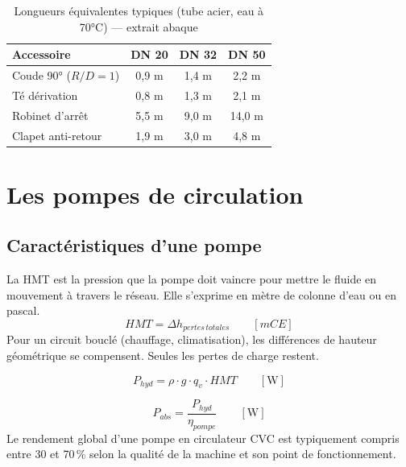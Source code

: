 \begin{table}[H]
  \centering
  \caption{Longueurs équivalentes typiques (tube acier, eau à 70°C) — extrait abaque}
  \begin{tabular}{lccc}
    \toprule
    Accessoire & DN 20 & DN 32 & DN 50 \\
    \midrule
    Coude 90° ($R/D=1$) & 0,9 m & 1,4 m & 2,2 m \\
    Té dérivation & 0,8 m & 1,3 m & 2,1 m \\
    Robinet d'arrêt & 5,5 m & 9,0 m & 14,0 m \\
    Clapet anti-retour & 1,9 m & 3,0 m & 4,8 m \\
    \bottomrule
  \end{tabular}
\end{table}

\section{Les pompes de circulation}

\subsection{Caractéristiques d'une pompe}

\begin{definition}[title=Hauteur manométrique totale (HMT)]
La HMT est la pression que la pompe doit vaincre pour mettre le fluide en mouvement à travers le réseau. Elle s'exprime en mètre de colonne d'eau ou en pascal.
\begin{equation}
  HMT = \Delta h_{pertes\,totales} \qquad \left[\si{mCE}\right]
\end{equation}
Pour un circuit bouclé (chauffage, climatisation), les différences de hauteur géométrique se compensent. Seules les pertes de charge restent.
\end{definition}

\begin{definition}[title=Puissance hydraulique]
\begin{equation}
  P_{hyd} = \rho \cdot g \cdot q_v \cdot HMT \qquad \left[\si{\watt}\right]
\end{equation}
\end{definition}

\begin{definition}[title=Puissance absorbée et rendement]
\begin{equation}
  P_{abs} = \frac{P_{hyd}}{\eta_{pompe}} \qquad \left[\si{\watt}\right]
\end{equation}
Le rendement global d'une pompe en circulateur CVC est typiquement compris entre 30 et 70\,\% selon la qualité de la machine et son point de fonctionnement.
\end{definition}

